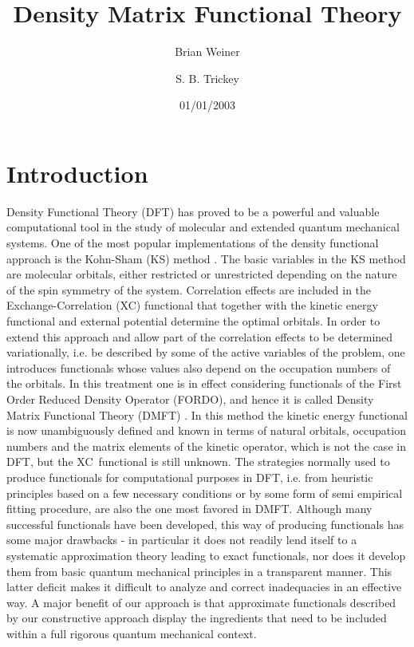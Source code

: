 \documentclass[aps,preprint]{revtex4}%
\begin{document}
\title[DMFT]{Density Matrix Functional Theory}
\author{Brian Weiner}
\author{S. B. Trickey}
\date{01/01/2003}
\maketitle
\tableofcontents


\section{ Introduction}

Density Functional Theory (DFT) \cite{DFTRev} has proved to be a powerful and
valuable computational tool in the study of molecular and extended quantum
mechanical systems. One of the most popular implementations of the density
functional approach is the Kohn-Sham (KS) method \cite{KS}. The basic
variables in the KS method are molecular orbitals, either restricted or
unrestricted depending on the nature of the spin symmetry of the system.
Correlation effects are included in the Exchange-Correlation (XC) functional
that together with the kinetic energy functional and external potential
determine the optimal orbitals. In order to extend this approach and allow
part of the correlation effects to be determined variationally, i.e. be
described by some of the active variables of the problem, one introduces
functionals whose values also depend on the occupation numbers of the
orbitals. In this treatment one is in effect considering functionals of the
First Order Reduced Density Operator (FORDO), and hence it is called Density
Matrix Functional Theory (DMFT) \cite{Staroverov02}.\cite{Yasuda02}%
\cite{Cioslowski02}\cite{Manby01}\cite{Yasuda01}\cite{Weitao}\cite{Holas99}%
\cite{Johnsen96}\cite{Morrison89}\cite{Wunsche80} In this method the kinetic
energy functional is now unambiguously defined and known in terms of natural
orbitals, occupation numbers and the matrix elements of the kinetic operator,
which is not the case in DFT, but the XC\ functional is still unknown. The
strategies normally used to produce functionals for computational purposes in
DFT, i.e. from heuristic principles based on a few necessary conditions or by
some form of semi empirical fitting procedure, are also the one most favored
in DMFT. Although many successful functionals have been developed, this way of
producing functionals has some major drawbacks - in particular it does not
readily lend itself to a systematic approximation theory leading to exact
functionals, nor does it develop them from basic quantum mechanical principles
in a transparent manner. This latter deficit makes it difficult to analyze and
correct inadequacies in an effective way. A major benefit of our approach is
that approximate functionals described by our constructive approach display
the ingredients that need to be included within a full rigorous quantum
mechanical context.
\end{document}
